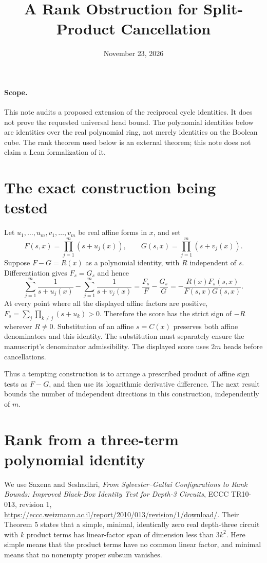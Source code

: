 \documentclass[11pt]{article}
\title{A Rank Obstruction for Split-Product Cancellation}
\author{}
\date{November 23, 2026}
\begin{document}
\maketitle

\paragraph{Scope.}
This note audits a proposed extension of the reciprocal cycle identities.
It does not prove the requested universal head bound. The polynomial
identities below are identities over the real polynomial ring, not merely
identities on the Boolean cube. The rank theorem used below is an external
theorem; this note does not claim a Lean formalization of it.

\section{The exact construction being tested}

Let $u_1,\ldots,u_m,v_1,\ldots,v_m$ be real affine forms in $x$, and set
\[
 F(s,x)=\prod_{j=1}^m(s+u_j(x)),\qquad
 G(s,x)=\prod_{j=1}^m(s+v_j(x)).
\]
Suppose $F-G=R(x)$ as a polynomial identity, with $R$ independent of $s$.
Differentiation gives $F_s=G_s$ and hence
\[
 \sum_{j=1}^m\frac1{s+u_j(x)}-
 \sum_{j=1}^m\frac1{s+v_j(x)}
 =\frac{F_s}{F}-\frac{G_s}{G}
 =-\frac{R(x)F_s(s,x)}{F(s,x)G(s,x)}.
\]
At every point where all the displayed affine factors are positive,
$F_s=\sum_j\prod_{k\ne j}(s+u_k)>0$. Therefore the score has the
strict sign of $-R$ wherever $R\ne0$. Substitution of an affine
$s=C(x)$ preserves both affine denominators and this identity. The
substitution must separately ensure the manuscript's denominator
admissibility. The displayed score uses $2m$ heads before cancellations.

Thus a tempting construction is to arrange a prescribed product of affine
sign tests as $F-G$, and then use its logarithmic derivative difference.
The next result bounds the number of independent directions in this
construction, independently of $m$.

\section{Rank from a three-term polynomial identity}

We use Saxena and Seshadhri, \emph{From Sylvester--Gallai Configurations
to Rank Bounds: Improved Black-Box Identity Test for Depth-3 Circuits},
ECCC TR10-013, revision 1,
\url{https://eccc.weizmann.ac.il/report/2010/013/revision/1/download/}.
Their Theorem 5 states that a simple, minimal, identically zero real
depth-three circuit with $k$ product terms has linear-factor span of
dimension less than $3k^2$. Here simple means that the product terms
have no common linear factor, and minimal means that no nonempty proper
subsum vanishes.
\end{document}
